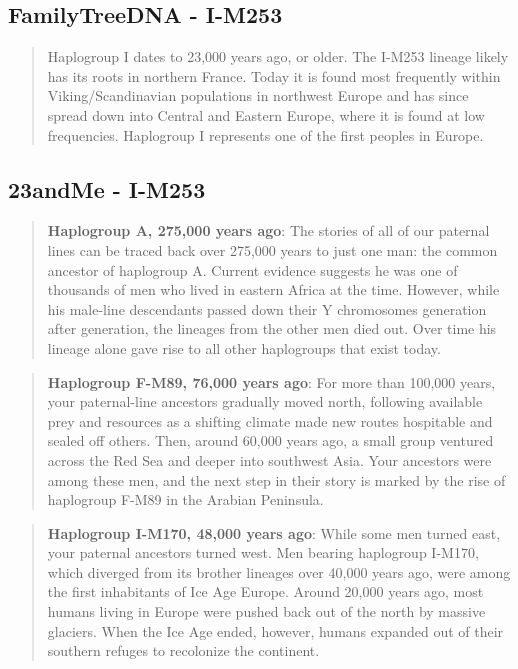 \documentclass[11pt,letter]{book}
\begin{document}
\subsection{FamilyTreeDNA - I-M253}

\begin{quote}
Haplogroup I dates to 23,000 years ago, or older. The I-M253 lineage likely has its roots in northern France. Today it is found most frequently within Viking/Scandinavian populations in northwest Europe and has since spread down into Central and Eastern Europe, where it is found at low frequencies. Haplogroup I represents one of the first peoples in Europe.\end{quote}

\subsection{23andMe - I-M253}

\begin{quote}
\textbf{Haplogroup A, 275,000 years ago}: The stories of all of our paternal lines can be traced back over 275,000 years to just one man: the common ancestor of haplogroup A. Current evidence suggests he was one of thousands of men who lived in eastern Africa at the time. However, while his male-line descendants passed down their Y chromosomes generation after generation, the lineages from the other men died out. Over time his lineage alone gave rise to all other haplogroups that exist today.
\end{quote}

\begin{quote}
\textbf{Haplogroup F-M89, 76,000 years ago}:  For more than 100,000 years, your paternal-line ancestors gradually moved north, following available prey and resources as a shifting climate made new routes hospitable and sealed off others. Then, around 60,000 years ago, a small group ventured across the Red Sea and deeper into southwest Asia. Your ancestors were among these men, and the next step in their story is marked by the rise of haplogroup F-M89 in the Arabian Peninsula.\end{quote}

\begin{quote}
\textbf{Haplogroup I-M170, 48,000 years ago}:  While some men turned east, your paternal ancestors turned west. Men bearing haplogroup I-M170, which diverged from its brother lineages over 40,000 years ago, were among the first inhabitants of Ice Age Europe. Around 20,000 years ago, most humans living in Europe were pushed back out of the north by massive glaciers. When the Ice Age ended, however, humans expanded out of their southern refuges to recolonize the continent.\end{quote}
\end{document}
